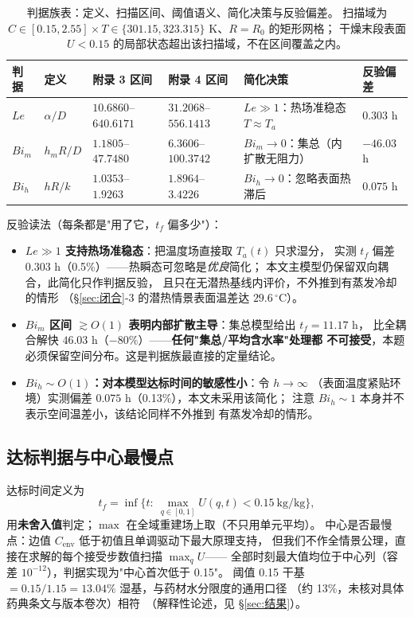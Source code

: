 \documentclass[12pt,a4paper]{ctexart}
\numberwithin{equation}{section}
\begin{document}
\begin{table}[htbp]
\centering
\caption{判据族表：定义、扫描区间、阈值语义、简化决策与反验偏差。
扫描域为 $C\in[0.15,2.55]\times T\in\{301.15,323.315\}$ K、$R=R_0$ 的矩形网格；
干燥末段表面 $U<0.15$ 的局部状态超出该扫描域，不在区间覆盖之内。}
\label{tab:判据族}
\small
\begin{tabular}{>{\raggedright\arraybackslash}p{0.78cm}>{\raggedright\arraybackslash}p{1.40cm}>{\raggedright\arraybackslash}p{2.45cm}>{\raggedright\arraybackslash}p{2.45cm}>{\raggedright\arraybackslash}p{4.69cm}>{\raggedright\arraybackslash}p{1.60cm}}
\toprule
判据 & 定义 & 附录 3 区间 & 附录 4 区间 & 简化决策 & 反验偏差 \\
\midrule
$Le$ & $\alpha/D$ & $10.6860$--$640.6171$ & $31.2068$--$556.1413$ & $Le\gg1$：热场准稳态 $T\approx T_a$ & $0.303$ h \\
$Bi_m$ & $h_mR/D$ & $1.1805$--$47.7480$ & $6.3606$--$100.3742$ & $Bi_m\to0$：集总（内扩散无阻力） & $-46.03$ h \\
$Bi_h$ & $hR/k$ & $1.0353$--$1.9263$ & $1.8964$--$3.4226$ & $Bi_h\to0$：忽略表面热滞后 & $0.075$ h \\
\bottomrule
\end{tabular}
\end{table}

反验读法（每条都是"用了它，$t_f$ 偏多少"）：
\begin{itemize}
  \item \textbf{$Le\gg1$ 支持热场准稳态}：把温度场直接取 $T_a(t)$ 只求湿分，
        实测 $t_f$ 偏差 $0.303$ h（0.5\%）——热瞬态可忽略是\emph{优良}简化；
        本文主模型仍保留双向耦合，此简化只作判据反验，
        且只在无潜热基线内评价，不外推到有蒸发冷却的情形
        （\S\ref{sec:闭合}-3 的潜热情景表面温差达 $29.6\,^{\circ}$C）。
  \item \textbf{$Bi_m$ 区间 $\gtrsim O(1)$ 表明内部扩散主导}：集总模型给出 $t_f=11.17$ h，
        比全耦合解快 $46.03$ h（$-80\%$）——\textbf{任何"集总/平均含水率"处理都
        不可接受}，本题必须保留空间分布。这是判据族最直接的定量结论。
  \item \textbf{$Bi_h\sim O(1)$：对本模型达标时间的敏感性小}：令 $h\to\infty$
        （表面温度紧贴环境）实测偏差 $0.075$ h（0.13\%），本文未采用该简化；
        注意 $Bi_h\sim1$ 本身并不表示空间温差小，该结论同样不外推到
        有蒸发冷却的情形。
\end{itemize}

\subsection{达标判据与中心最慢点}
达标时间定义为
\begin{equation}
t_f=\inf\{t:\ \max_{q\in[0,1]}U(q,t)<0.15\ \text{kg/kg}\},
\label{eq:达标}
\end{equation}
用\textbf{未舍入值}判定；$\max$ 在全域重建场上取（不只用单元平均）。
中心是否最慢点：边值 $C_{\mathrm{env}}$ 低于初值且单调驱动下最大原理支持，
但我们不作全情景公理，直接在求解的每个接受步数值扫描 $\max_q U$——
全部时刻最大值均位于中心列（容差 $10^{-12}$），判据实现为"中心首次低于 0.15"。
阈值 0.15 干基 $=0.15/1.15=13.04\%$ 湿基，与药材水分限度的通用口径
（约 13\%，未核对具体药典条文与版本卷次）相符~\cite{pharmacopoeia}（解释性论述，见 \S\ref{sec:结果}）。
\end{document}
